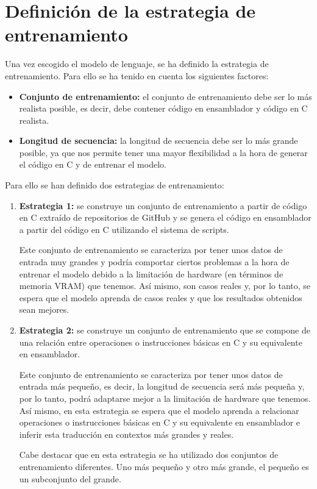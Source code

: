 \section{Definición de la estrategia de entrenamiento}
\label{sec:estrategia_entrenamiento}


Una vez escogido el modelo de lenguaje, se ha definido la estrategia de entrenamiento.
Para ello se ha tenido en cuenta los siguientes factores:

\begin{itemize}
    \item \textbf{Conjunto de entrenamiento:} el conjunto de entrenamiento debe ser
        lo más realista posible, es decir, debe contener código en ensamblador y código
        en C realista.
    \item \textbf{Longitud de secuencia:} la longitud de secuencia debe ser lo más
        grande posible, ya que nos permite tener una mayor flexibilidad a la hora de
        generar el código en C y de entrenar el modelo.
\end{itemize}

Para ello se han definido dos estrategias de entrenamiento:

\begin{enumerate}
    \item \textbf{Estrategia 1:} se construye un conjunto de entrenamiento a partir
        de código en C extraído de repositorios de GitHub y se genera el código en
        ensamblador a partir del código en C utilizando el sistema de scripts.

        Este conjunto de entrenamiento se caracteriza por tener unos datos de entrada
        muy grandes y podría comportar ciertos problemas a la hora de entrenar el modelo
        debido a la limitación de hardware (en términos de memoria VRAM) que tenemos. Así
        mismo, son casos reales y, por lo tanto, se espera que el modelo aprenda de casos
        reales y que los resultados obtenidos sean mejores.

    \item \textbf{Estrategia 2:} se construye un conjunto de entrenamiento que se compone
        de una relación entre operaciones o instrucciones básicas en C y su equivalente
        en ensamblador.

        Este conjunto de entrenamiento se caracteriza por tener unos datos de entrada
        más pequeño, es decir, la longitud de secuencia será más pequeña y, por lo tanto,
        podrá adaptarse mejor a la limitación de hardware que tenemos. Así mismo, en esta 
        estrategia se espera que el modelo aprenda a relacionar operaciones o instrucciones
        básicas en C y su equivalente en ensamblador e inferir esta traducción en contextos más
        grandes y reales.

        Cabe destacar que en esta estrategia se ha utilizado dos conjuntos de entrenamiento
        diferentes. Uno más pequeño y otro más grande, el pequeño es un subconjunto del grande.
\end{enumerate}

